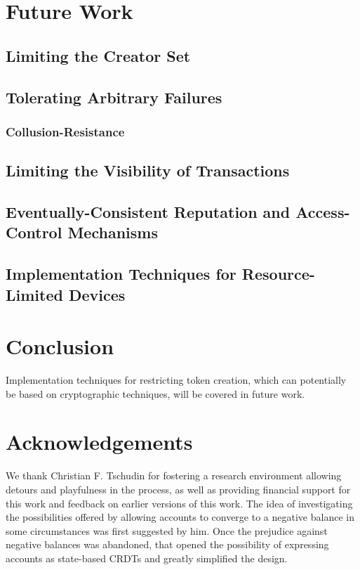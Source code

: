 \documentclass[9pt, oneside]{article}   	%
\begin{document}
\section{Future Work}
 
\subsection{Limiting the Creator Set}

\subsection{Tolerating Arbitrary Failures}

	\subsubsection{Collusion-Resistance}

\subsection{Limiting the Visibility of Transactions}

\subsection{Eventually-Consistent Reputation and Access-Control Mechanisms}

\subsection{Implementation Techniques for Resource-Limited Devices}

\section{Conclusion}
\label{sec:conclusion}

Implementation techniques for restricting token creation, which can potentially be based on cryptographic techniques, will be covered in future work.

\section{Acknowledgements}
\label{sec:acknowledgements}

We thank Christian F. Tschudin for fostering a research environment allowing detours and playfulness in the process, as well as providing financial support for this work and feedback on earlier versions of this work. The idea of investigating the possibilities offered by allowing accounts to converge to a negative balance in some circumstances was first suggested by him. Once the prejudice against negative balances was abandoned, that opened the possibility of expressing accounts as state-based CRDTs and greatly simplified the design.
\end{document}
